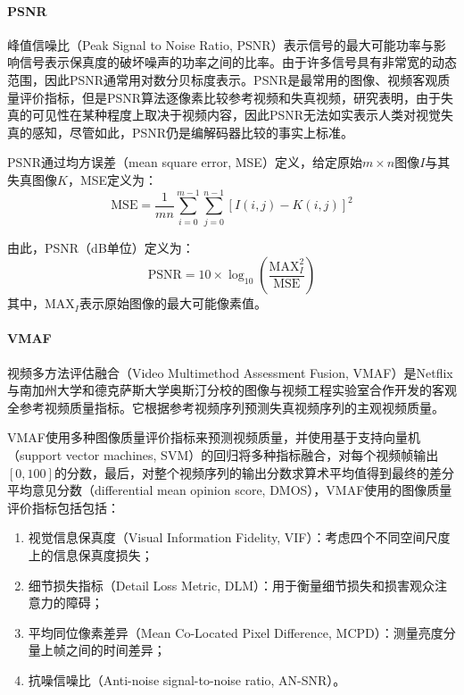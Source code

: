 	\paragraph{PSNR}
	峰值信噪比（Peak Signal to Noise Ratio, PSNR）表示信号的最大可能功率与影响信号表示保真度的破坏噪声的功率之间的比率。由于许多信号具有非常宽的动态范围，因此PSNR通常用对数分贝标度表示。PSNR是最常用的图像、视频客观质量评价指标，但是PSNR算法逐像素比较参考视频和失真视频，研究\cite{huynh-thuAccuracyPSNRPredicting2012}表明，由于失真的可见性在某种程度上取决于视频内容，因此PSNR无法如实表示人类对视觉失真的感知，尽管如此，PSNR仍是编解码器比较的事实上标准。

	PSNR通过均方误差（mean square error, MSE）定义，给定原始$m\times n$图像$I$与其失真图像$K$，MSE定义为：
	\begin{equation}
		\mathrm{MSE} = \frac{1}{mn} \sum_{i=0}^{m-1} \sum_{j=0}^{n-1}[I(i, j) - K(i, j)]^2
	\end{equation}

	由此，PSNR（dB单位）定义为：
	\begin{equation}
	\mathrm{PSNR} = 10 \times \log_10 \left(\frac{\mathrm{MAX}_I^2}{\mathrm{MSE}}\right)
	\end{equation}
	其中，$\mathrm{MAX}_I$表示原始图像的最大可能像素值。
	\paragraph{VMAF}
	视频多方法评估融合（Video Multimethod Assessment Fusion, VMAF\cite{liPracticalPerceptualVideo}）是Netflix与南加州大学和德克萨斯大学奥斯汀分校的图像与视频工程实验室合作开发的客观全参考视频质量指标。它根据参考视频序列预测失真视频序列的主观视频质量。

	VMAF使用多种图像质量评价指标来预测视频质量，并使用基于支持向量机（support vector machines, SVM）的回归将多种指标融合，对每个视频帧输出$[0,100]$的分数，最后，对整个视频序列的输出分数求算术平均值得到最终的差分平均意见分数（differential mean opinion score, DMOS），VMAF使用的图像质量评价指标包括包括：
	\begin{enumerate}[label=\arabic*)]
		\item 视觉信息保真度（Visual Information Fidelity, VIF）：考虑四个不同空间尺度上的信息保真度损失；
		\item 细节损失指标（Detail Loss Metric, DLM）：用于衡量细节损失和损害观众注意力的障碍；
		\item 平均同位像素差异（Mean Co-Located Pixel Difference, MCPD）：测量亮度分量上帧之间的时间差异；
		\item 抗噪信噪比（Anti-noise signal-to-noise ratio, AN-SNR）。
	\end{enumerate}

